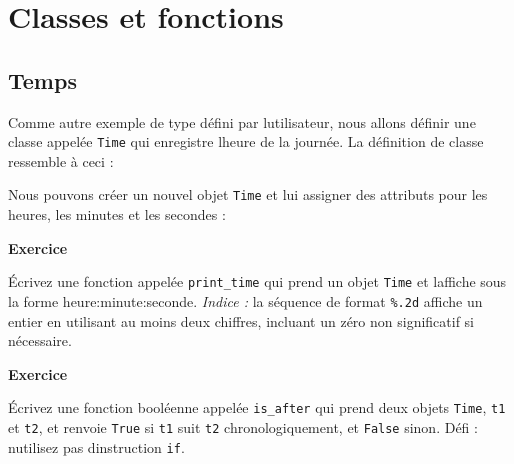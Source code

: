 \hypertarget{classes-et-fonctions}{%
\section{Classes et fonctions}\label{classes-et-fonctions}}

\hypertarget{temps}{%
\subsection{Temps}\label{temps}}

Comme autre exemple de type défini par l\textquotesingle utilisateur,
nous allons définir une classe appelée \texttt{Time} qui enregistre
l\textquotesingle heure de la journée. La définition de classe ressemble
à ceci :

\begin{Shaded}
\begin{Highlighting}[]
\NormalTok{):}

\end{Highlighting}
\end{Shaded}

Nous pouvons créer un nouvel objet \texttt{Time} et lui assigner des
attributs pour les heures, les minutes et les secondes :

\begin{Shaded}
\begin{Highlighting}[]
\OperatorTok{=}
\OperatorTok{=} 
\OperatorTok{=} 
\OperatorTok{=} 
\end{Highlighting}
\end{Shaded}

\textbf{Exercice}

Écrivez une fonction appelée \texttt{print\_time} qui prend un objet
\texttt{Time} et l\textquotesingle affiche sous la forme
heure:minute:seconde. \emph{Indice :} la séquence de format
\texttt{\textquotesingle{}\%.2d\textquotesingle{}} affiche un entier en
utilisant au moins deux chiffres, incluant un zéro non significatif si
nécessaire.

\textbf{Exercice}

Écrivez une fonction booléenne appelée \texttt{is\_after} qui prend deux
objets \texttt{Time}, \texttt{t1} et \texttt{t2}, et renvoie
\texttt{True} si \texttt{t1} suit \texttt{t2} chronologiquement, et
\texttt{False} sinon. Défi : n\textquotesingle utilisez pas
d\textquotesingle instruction \texttt{if}.

